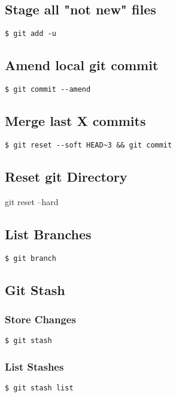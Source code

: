 \documentclass{article}
\begin{document}
\begin{multicols}{3}
\subsection{Stage all "not new" files}
\lstinline|$ git add -u|

\subsection{Amend local git commit}
\lstinline|$ git commit --amend|

\subsection{Merge last X commits}
\lstinline|$ git reset --soft HEAD~3 && git commit|

\subsection{Reset git Directory}
git reset --hard

\subsection{List Branches}
\lstinline|$ git branch|

\subsection{Git Stash}
\subsubsection{Store Changes}
\lstinline|$ git stash|

\subsubsection{List Stashes}
\lstinline|$ git stash list|

\end{multicols}
\end{document}
